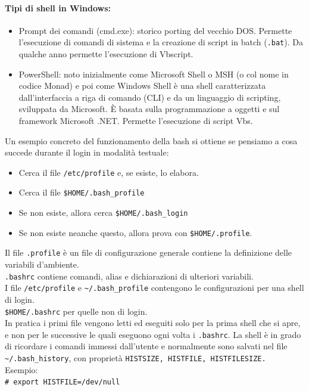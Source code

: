 \documentclass[a4paper]{report}
\newcommand\tab[1][1cm]{\hspace*{#1}}
\begin{document}
\paragraph{Tipi di shell in Windows:}
\begin{itemize}
\item Prompt dei comandi (cmd.exe): storico porting del
vecchio DOS. Permette l’esecuzione di comandi di
sistema e la creazione di script in batch (\texttt{.bat}). Da
qualche anno permette l’esecuzione di Vbscript.
\item PowerShell: noto inizialmente come Microsoft Shell o
MSH (o col nome in codice Monad) e poi come Windows
Shell è una shell caratterizzata dall'interfaccia a riga di
comando (CLI) e da un linguaggio di scripting, sviluppata
da Microsoft. È basata sulla programmazione a oggetti e
sul framework Microsoft .NET. Permette l’esecuzione di
script Vbs.
\end{itemize}
Un esempio concreto del funzionamento della bash si ottiene se pensiamo a cosa succede durante il login in modalità testuale: 
\begin{itemize}
\item Cerca il file \texttt{/etc/profile} e, se esiste, lo
elabora.
\item Cerca il file \texttt{\$HOME/.bash\_profile}
\item Se non esiste, allora cerca \texttt{\$HOME/.bash\_login}
\item Se non esiste neanche questo, allora prova con
\texttt{\$HOME/.profile}.
\end{itemize}
Il file \texttt{.profile} è un file di configurazione generale
contiene la definizione delle variabili d'ambiente.
\\\texttt{.bashrc} contiene comandi, alias e dichiarazioni di ulteriori
variabili.
\\I file \texttt{/etc/profile} e \texttt{\textasciitilde/.bash\_profile} contengono le
configurazioni per una shell di login.
\\\texttt{\$HOME/.bashrc} per quelle non di login.
\\In pratica i primi file vengono letti ed eseguiti solo per la
prima shell che si apre, e non per le successive le quali
eseguono ogni volta i \texttt{.bashrc}.
La shell è in grado di ricordare i comandi
immessi dall'utente e normalmente sono salvati
nel file \texttt{\textasciitilde/.bash\_history}, con proprietà \texttt{HISTSIZE, HISTFILE, HISTFILESIZE.}
\\Esempio:\\
\tab\texttt{\# export HISTFILE=/dev/null}\\
\end{document}
